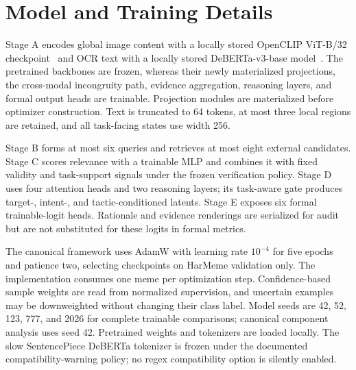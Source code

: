 \section{Model and Training Details}
\label{sec:supp:implementation}

Stage A encodes global image content with a locally stored OpenCLIP
ViT-B/32 checkpoint~\cite{radford2021clip,cherti2023openclip} and OCR text
with a locally stored DeBERTa-v3-base model~\cite{he2023debertav3}.  The
pretrained backbones are frozen, whereas their newly materialized projections,
the cross-modal incongruity path, evidence aggregation, reasoning layers, and
formal output heads are trainable.  Projection modules are materialized before
optimizer construction.  Text is truncated to 64 tokens, at most three local
regions are retained, and all task-facing states use width 256.

Stage B forms at most six queries and retrieves at most eight external
candidates.  Stage C scores relevance with a trainable MLP and combines it
with fixed validity and task-support signals under the frozen verification
policy.  Stage D uses four attention heads and two reasoning layers; its
task-aware gate produces target-, intent-, and tactic-conditioned latents.
Stage E exposes six formal trainable-logit heads.  Rationale and evidence
renderings are serialized for audit but are not substituted for these logits
in formal metrics.

The canonical framework uses AdamW with learning rate $10^{-4}$ for five
epochs and patience two, selecting checkpoints on HarMeme validation only.
The implementation consumes one meme per optimization step.  Confidence-based
sample weights are read from normalized supervision, and uncertain examples
may be downweighted without changing their class label.  Model seeds are
42, 52, 123, 777, and 2026 for complete trainable comparisons; canonical
component analysis uses seed 42.  Pretrained weights and tokenizers are loaded
locally.  The slow SentencePiece DeBERTa tokenizer is frozen under the
documented compatibility-warning policy; no regex compatibility option is
silently enabled.
